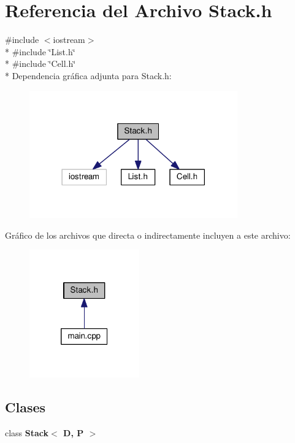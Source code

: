 \section{Referencia del Archivo Stack.\-h}
\label{_stack_8h}
{\ttfamily \#include $<$iostream$>$}\\*
{\ttfamily \#include \char`\"{}List.\-h\char`\"{}}\\*
{\ttfamily \#include \char`\"{}Cell.\-h\char`\"{}}\\*
Dependencia gráfica adjunta para Stack.\-h\-:\nopagebreak
\begin{figure}[H]
\begin{center}
\leavevmode
\includegraphics[width=254pt]{_stack_8h__incl}
\end{center}
\end{figure}
Gráfico de los archivos que directa o indirectamente incluyen a este archivo\-:\nopagebreak
\begin{figure}[H]
\begin{center}
\leavevmode
\includegraphics[width=134pt]{_stack_8h__dep__incl}
\end{center}
\end{figure}
\subsection*{Clases}
\begin{DoxyCompactItemize}
\item 
class {\bf Stack$<$ D, P $>$}
\end{DoxyCompactItemize}
